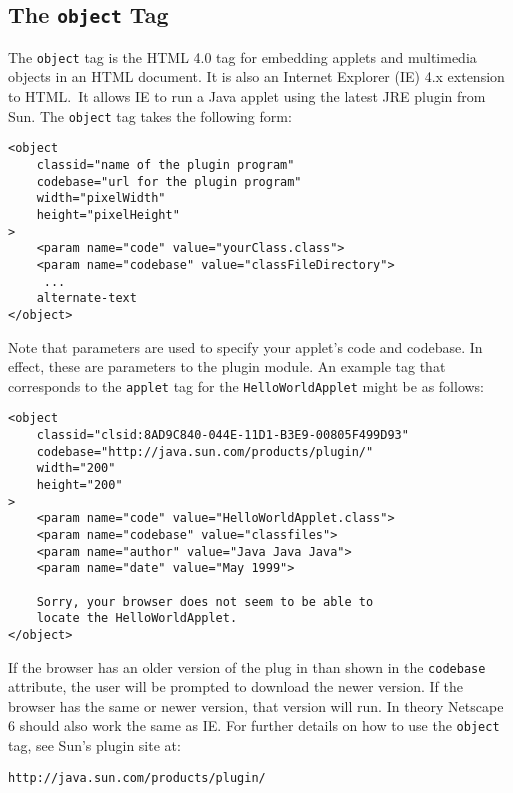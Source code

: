 \subsection*{The {\tt object} Tag}
\noindent The {\tt object} tag is the HTML 4.0 tag for embedding applets and
multimedia objects in an HTML document.  It is also an Internet
Explorer (IE) 4.x extension to HTML.~It allows IE to run a Java applet
using the latest JRE plugin from Sun.  The {\tt object} tag takes the
following form:

\begin{jjjlisting}
\begin{lstlisting}
<object
    classid="name of the plugin program"
    codebase="url for the plugin program"
    width="pixelWidth"
    height="pixelHeight"
>
    <param name="code" value="yourClass.class">
    <param name="codebase" value="classFileDirectory">
     ...
    alternate-text
</object>
\end{lstlisting}
\end{jjjlisting}

\noindent Note that parameters are used to specify your
applet's code and codebase.  In effect, these are parameters
to the plugin module.  An example tag that corresponds
to the {\tt applet} tag for the {\tt HelloWorldApplet}
might be as follows:

\begin{jjjlisting}
\begin{lstlisting}
<object
    classid="clsid:8AD9C840-044E-11D1-B3E9-00805F499D93"
    codebase="http://java.sun.com/products/plugin/"
    width="200"
    height="200"
>
    <param name="code" value="HelloWorldApplet.class">
    <param name="codebase" value="classfiles">
    <param name="author" value="Java Java Java">
    <param name="date" value="May 1999">

    Sorry, your browser does not seem to be able to
    locate the HelloWorldApplet.
</object>
\end{lstlisting}
\end{jjjlisting}

\noindent If the browser has an older version of the plug in than
shown in the {\tt codebase} attribute, the user will be prompted to
download the newer version. If the browser has the same or newer
version, that version will run. In theory Netscape 6 should also work
the same as IE.  For further details on how to use the {\tt object}
tag, see Sun's plugin site at:

\begin{jjjlisting}
\begin{lstlisting}[commentstyle=\color{black}]
http://java.sun.com/products/plugin/
\end{lstlisting}
\end{jjjlisting}


